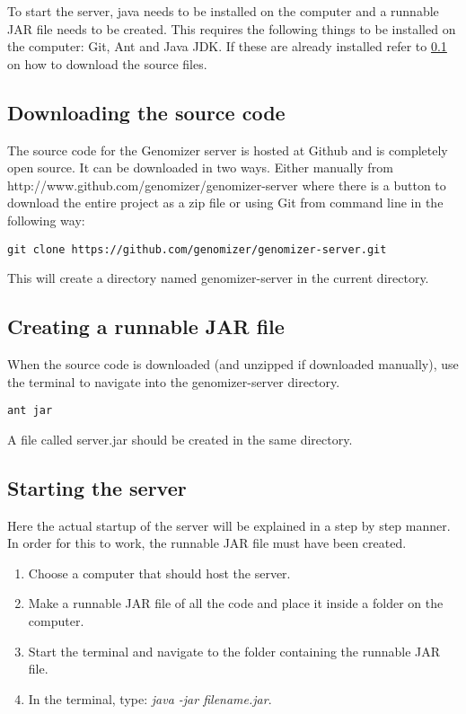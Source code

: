 To start the server, java needs to be installed on the computer and a runnable JAR file needs to be created.
This requires the following things to be installed on the computer: Git, Ant and Java JDK. 
If these are already installed refer to \ref{sec:com_download} on how to download the source files.

\subsection{Downloading the source code}\label{sec:com_download}

The source code for the Genomizer server is hosted at Github and is completely open source. It can be downloaded in
two ways. Either manually from http://www.github.com/genomizer/genomizer-server where there is a button to
download the entire project as a zip file or using Git from command line in the following way:
\begin{verbatim}
git clone https://github.com/genomizer/genomizer-server.git
\end{verbatim}
This will create a directory named genomizer-server in the current directory.

\subsection{Creating a runnable JAR file}\label{sec:com_makejar}

When the source code is downloaded (and unzipped if downloaded manually), use the terminal to navigate into
the genomizer-server directory.
\begin{verbatim}
ant jar
\end{verbatim}
A file called server.jar should be created in the same directory.


\subsection{Starting the server}
Here the actual startup of the server will be explained in a step by step manner.
In order for this to work, the runnable JAR file must have been created.
\begin{enumerate}
\item Choose a computer that should host the server.
\item Make a runnable JAR file of all the code and place it inside a folder on the computer.
\item Start the terminal and navigate to the folder containing the runnable JAR file.
\item In the terminal, type: \emph{java -jar filename.jar}.
\end{enumerate}
